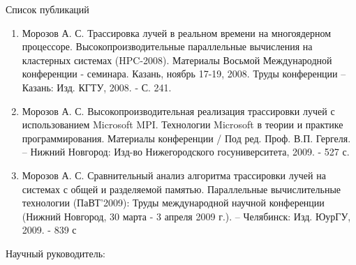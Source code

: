 \documentclass[14pt, a4paper, utf8, draft]{extarticle}
\begin{document}
{\Large Список публикаций}
\begin{enumerate}
\item Морозов А. С. Трассировка лучей в реальном времени на многоядерном процессоре. Высокопроизводительные параллельные вычисления на кластерных системах (HPC-2008). Материалы Восьмой Международной конференции - семинара. Казань, ноябрь 17-19, 2008. Труды конференции -- Казань: Изд. КГТУ, 2008. - С. 241.
\item Морозов А. С. Высокопроизводительная реализация трассировки лучей с использованием Microsoft MPI. Технологии Microsoft в теории и практике программирования. Материалы конференции / Под ред. Проф. В.П. Гергеля. -- Нижний Новгород: Изд-во Нижегородского госуниверситета, 2009. - 527 с.
\item Морозов А. С. Сравнительный анализ алгоритма трассировки лучей на системах с общей и разделяемой памятью. Параллельные вычислительные технологии (ПаВТ’2009): Труды международной научной конференции (Нижний Новгород, 30 марта - 3 апреля 2009 г.). -- Челябинск: Изд. ЮурГУ, 2009. - 839 с
\end{enumerate}

\vspace*{5cm}
{Научный руководитель: \noindent
\hspace*{1.5cm}\hspace{-1.5cm}{\ \ \hrulefill\ \ \ Турлапов В. Е. }
}
\end{document}
